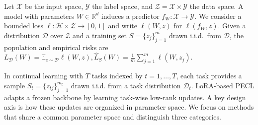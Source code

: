 \documentclass{article}
\theoremstyle{plain}
\theoremstyle{definition}
\theoremstyle{remark}
\begin{document}
Let $\mathcal X$ be the input space, $\mathcal Y$ the label space, and $\mathcal Z = \mathcal X \times \mathcal Y$ the data space.
A model with parameters $W \in \mathbb R^d$ induces a predictor $f_W : \mathcal X \to \mathcal Y$.
We consider a bounded loss $\ell : \mathcal H \times \mathcal Z \to [0,1]$ and write $\ell(W,z)$ for $\ell(f_W,z)$. 
Given a distribution $\mathcal D$ over $\mathcal Z$ and a training set $S=\{z_j\}_{j=1}^m$ drawn i.i.d.\ from $\mathcal D$, the population and empirical risks are
$
L_{\mathcal D}(W)
=
\mathbb E_{z\sim\mathcal D}\ell(W,z),
\hat L_{S}(W)
=
\frac{1}{m}\sum_{j=1}^{m}\ell(W,z_{j}).
$







In continual learning with \(T\) tasks indexed by \(t=1,\dots,T\), each task provides a sample \(S_t =\{z_{tj}\}_{j=1}^{m_t}\) drawn i.i.d. from a task distribution \(\mathcal{D}_t\). LoRA-based PECL adapts a frozen backbone by learning task-wise low-rank updates. A key design axis is how these updates are organized in parameter space. We focus on methods that share a common parameter space and distinguish three categories.
\end{document}
